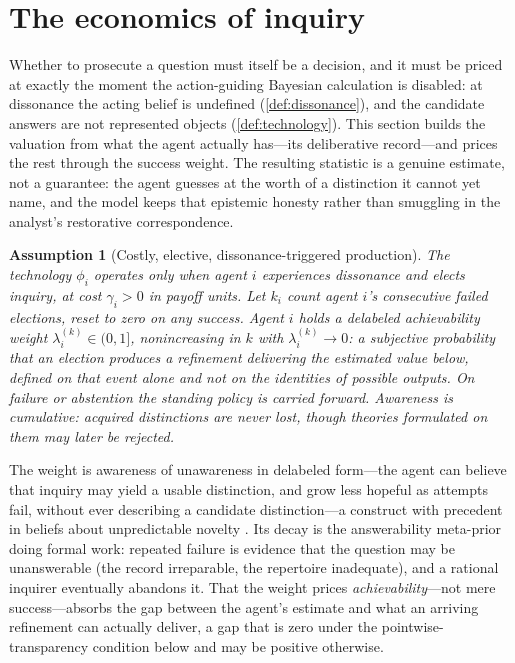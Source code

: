 \documentclass[11pt]{article}
\newtheorem{assumption}{Assumption}[section]
\theoremstyle{definition}
\begin{document}
\section{The economics of inquiry}
\label{sec:economics}

Whether to prosecute a question must itself be a decision, and it must be priced at exactly the moment the action-guiding Bayesian calculation is disabled: at dissonance the acting belief is undefined (\cref{def:dissonance}), and the candidate answers are not represented objects (\cref{def:technology}).
This section builds the valuation from what the agent actually has---its deliberative record---and prices the rest through the success weight.
The resulting statistic is a genuine estimate, not a guarantee: the agent guesses at the worth of a distinction it cannot yet name, and the model keeps that epistemic honesty rather than smuggling in the analyst's restorative correspondence.

\begin{assumption}[Costly, elective, dissonance-triggered production]
\label{ass:elective}
The technology $\phi_i$ operates only when agent $i$ experiences dissonance and elects inquiry, at cost $\gamma_i>0$ in payoff units.
Let $k_i$ count agent $i$'s consecutive failed elections, reset to zero on any success.
Agent $i$ holds a \emph{delabeled achievability weight} $\lambda_i^{(k)}\in(0,1]$, nonincreasing in $k$ with $\lambda_i^{(k)}\to0$: a subjective probability that an election produces a refinement \emph{delivering the estimated value below}, defined on that event alone and not on the identities of possible outputs.
On failure or abstention the standing policy is carried forward.
Awareness is cumulative: acquired distinctions are never lost, though theories formulated on them may later be rejected.
\end{assumption}

The weight is awareness of unawareness in delabeled form---the agent can believe that inquiry may yield a usable distinction, and grow less hopeful as attempts fail, without ever describing a candidate distinction---a construct with precedent in beliefs about unpredictable novelty \citep{Schipper2025,KarniViero2017}.
Its decay is the answerability meta-prior doing formal work: repeated failure is evidence that the question may be unanswerable (the record irreparable, the repertoire inadequate), and a rational inquirer eventually abandons it.
That the weight prices \emph{achievability}---not mere success---absorbs the gap between the agent's estimate and what an arriving refinement can actually deliver, a gap that is zero under the pointwise-transparency condition below and may be positive otherwise.
\end{document}
